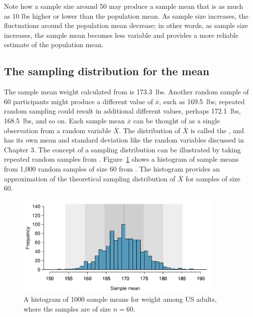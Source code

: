 Note how a sample size around 50 may produce a sample mean that is as much as 10 lbs higher or lower than the population mean. As sample size increases, the fluctuations around the population mean decrease; in other words, as sample size increases, the sample mean becomes less variable and provides a more reliable estimate of the population mean.




\subsection{The sampling distribution for the mean}

The sample mean weight calculated from  is 173.3~lbs. Another random sample of 60 participants might produce a different value of $\overline{x}$, such as 169.5~lbs; repeated random sampling could result in additional different values, perhaps 172.1~lbs, 168.5~lbs, and so on. Each sample mean $\overline{x}$ can be thought of as a single observation from a random variable $\overline{X}$. The distribution of $\overline{X}$ is called the , and has its own mean and standard deviation like the random variables discussed in Chapter 3. The concept of a sampling distribution can be illustrated by taking repeated random samples from . Figure~\ref{cdcWeight1000SampDist} shows a histogram of sample means from 1,000 random samples of size 60 from . The histogram provides an approximation of the theoretical sampling distribution of $\overline{X}$ for samples of size 60. 

\begin{figure}[h]
	\centering
	\includegraphics[width=0.9\textwidth]
	{ch_03a_inference_foundations_oi_biostat/figures/cdcWeight1000SampDist/cdcWeight1000SampDist}
	\caption{A histogram of 1000 sample means for weight among US adults, where the samples are of size $n=60$.}
	\label{cdcWeight1000SampDist}
\end{figure}

